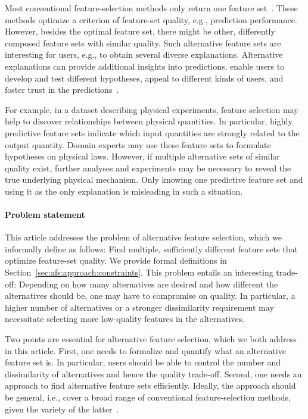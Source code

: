 \documentclass{article}
\theoremstyle{definition}
\begin{document}
Most conventional feature-selection methods only return one feature set~\cite{borboudakis2021extending}.
These methods optimize a criterion of feature-set quality, e.g., prediction performance.
However, besides the optimal feature set, there might be other, differently composed feature sets with similar quality.
Such alternative feature sets are interesting for users, e.g., to obtain several diverse explanations.
Alternative explanations can provide additional insights into predictions, enable users to develop and test different hypotheses, appeal to different kinds of users, and foster trust in the predictions~\cite{kim2021multi, wang2019designing}.

For example, in a dataset describing physical experiments, feature selection may help to discover relationships between physical quantities.
In particular, highly predictive feature sets indicate which input quantities are strongly related to the output quantity.
Domain experts may use these feature sets to formulate hypotheses on physical laws.
However, if multiple alternative sets of similar quality exist, further analyses and experiments may be necessary to reveal the true underlying physical mechanism.
Only knowing one predictive feature set and using it as the only explanation is misleading in such a situation.

\paragraph{Problem statement}

This article addresses the problem of alternative feature selection, which we informally define as follows:
Find multiple, sufficiently different feature sets that optimize feature-set quality.
We provide formal definitions in Section~\ref{sec:afs:approach:constraints}.
This problem entails an interesting trade-off:
Depending on how many alternatives are desired and how different the alternatives should be, one may have to compromise on quality.
In particular, a higher number of alternatives or a stronger dissimilarity requirement may necessitate selecting more low-quality features in the alternatives.

Two points are essential for alternative feature selection, which we both address in this article.
First, one needs to formalize and quantify what an alternative feature set is.
In particular, users should be able to control the number and dissimilarity of alternatives and hence the quality trade-off.
Second, one needs an approach to find alternative feature sets efficiently.
Ideally, the approach should be general, i.e., cover a broad range of conventional feature-selection methods, given the variety of the latter~\cite{chandrashekar2014survey, li2017feature}.
\end{document}
